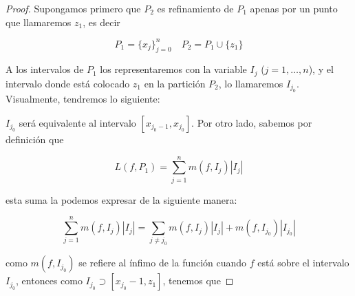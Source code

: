 \begin{proof}
    Supongamos primero que $P_2$ es refinamiento de $P_1$ apenas por un punto que llamaremos $z_1$, es decir
    
    \[
    P_1 = \{ x_j \}_{j=0}^n \quad P_2 = P_1 \cup \{ z_1 \}
    \]
    
    A los intervalos de $P_1$ los representaremos con la variable $I_j$ ($j = 1, \dots, n$), y el intervalo donde está colocado $z_1$ en la partición $P_2$, lo llamaremos $I_{j_0}$. Visualmente, tendremos lo siguiente:
    
    \begin{center}
    \end{center}
    
    $I_{j_0}$ será equivalente al intervalo $[x_{j_0-1}, x_{j_0}]$. Por otro lado, sabemos por definición que
    
    \[
    L(f, P_1) = \sum_{j=1}^n m(f, I_j)|I_j|
    \]
    
    \noindent esta suma la podemos expresar de la siguiente manera:
    
    \[
    \sum_{j=1}^n m(f, I_j)|I_j| = \sum_{j \neq j_0} m(f, I_j)|I_j| + m(f, I_{j_0})|I_{j_0}|
    \]
    
    \noindent como $m(f,I_{j_0})$ se refiere al ínfimo de la función cuando $f$ está sobre el intervalo $I_{j_0}$, entonces como $I_{j_0} \supset [x_{j_0}-1,z_1]$, tenemos que
    

\end{proof}
